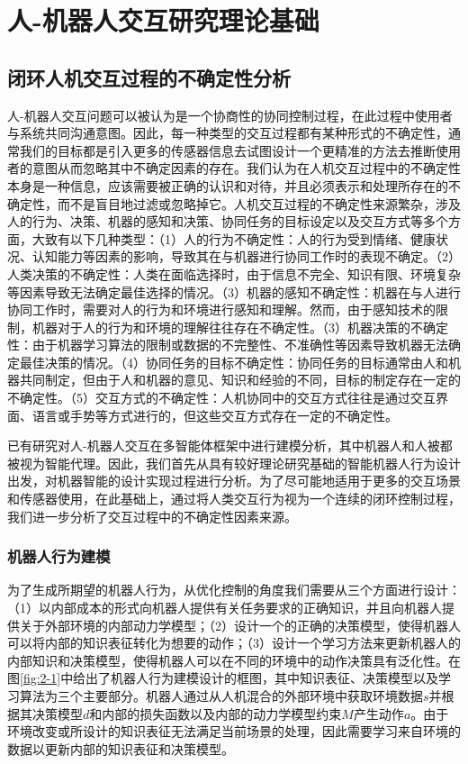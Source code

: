\chapter{人-机器人交互研究理论基础}

\section{闭环人机交互过程的不确定性分析}
人-机器人交互问题可以被认为是一个协商性的协同控制过程，在此过程中使用者与系统共同沟通意图。因此，每一种类型的交互过程都有某种形式的不确定性，通常我们的目标都是引入更多的传感器信息去试图设计一个更精准的方法去推断使用者的意图从而忽略其中不确定因素的存在。我们认为在人机交互过程中的不确定性本身是一种信息，应该需要被正确的认识和对待，并且必须表示和处理所存在的不确定性，而不是盲目地过滤或忽略掉它。人机交互过程的不确定性来源繁杂，涉及人的行为、决策、机器的感知和决策、协同任务的目标设定以及交互方式等多个方面，大致有以下几种类型：（1）人的行为不确定性：人的行为受到情绪、健康状况、认知能力等因素的影响，导致其在与机器进行协同工作时的表现不确定。（2）人类决策的不确定性：人类在面临选择时，由于信息不完全、知识有限、环境复杂等因素导致无法确定最佳选择的情况。（3）机器的感知不确定性：机器在与人进行协同工作时，需要对人的行为和环境进行感知和理解。然而，由于感知技术的限制，机器对于人的行为和环境的理解往往存在不确定性。（3）机器决策的不确定性：由于机器学习算法的限制或数据的不完整性、不准确性等因素导致机器无法确定最佳决策的情况。（4）协同任务的目标不确定性：协同任务的目标通常由人和机器共同制定，但由于人和机器的意见、知识和经验的不同，目标的制定存在一定的不确定性。（5）交互方式的不确定性：人机协同中的交互方式往往是通过交互界面、语言或手势等方式进行的，但这些交互方式存在一定的不确定性。

已有研究对人-机器人交互在多智能体框架中进行建模分析，其中机器人和人被都被视为智能代理\cite{liuDesigningRobotBehavior}。因此，我们首先从具有较好理论研究基础的智能机器人行为设计出发，对机器智能的设计实现过程进行分析。为了尽可能地适用于更多的交互场景和传感器使用，在此基础上，通过将人类交互行为视为一个连续的闭环控制过程，我们进一步分析了交互过程中的不确定性因素来源。

\subsection{机器人行为建模}
为了生成所期望的机器人行为，从优化控制的角度我们需要从三个方面进行设计\cite{liuDesigningRobotBehavior}：（1）以内部成本的形式向机器人提供有关任务要求的正确知识，并且向机器人提供关于外部环境的内部动力学模型；（2）设计一个的正确的决策模型，使得机器人可以将内部的知识表征转化为想要的动作；（3）设计一个学习方法来更新机器人的内部知识和决策模型，使得机器人可以在不同的环境中的动作决策具有泛化性。在图\ref{fig:2-1}中给出了机器人行为建模设计的框图，其中知识表征、决策模型以及学习算法为三个主要部分。机器人通过从人机混合的外部环境中获取环境数据$s$并根据其决策模型$d$和内部的损失函数以及内部的动力学模型约束$M$产生动作$a$。由于环境改变或所设计的知识表征无法满足当前场景的处理，因此需要学习来自环境的数据以更新内部的知识表征和决策模型。

